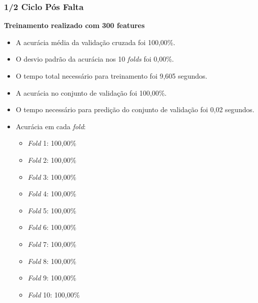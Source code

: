 \subsubsection{1/2 Ciclo Pós Falta}
\textbf{Treinamento realizado com 300 features}
\begin{itemize}
    \item A acurácia média da validação cruzada foi 100,00\%.
    \item O desvio padrão da acurácia nos 10 \textit{folds} foi 0,00\%.
    \item O tempo total necessário para treinamento foi 9,605 segundos.
    \item A acurácia no conjunto de validação foi 100,00\%.
    \item O tempo necessário para predição do conjunto de validação foi 0,02 segundos.
    \item Acurácia em cada \textit{fold}:
    \begin{itemize}
        \item \textit{Fold} 1: 100,00\%
        \item \textit{Fold} 2: 100,00\%
        \item \textit{Fold} 3: 100,00\%
        \item \textit{Fold} 4: 100,00\%
        \item \textit{Fold} 5: 100,00\%
        \item \textit{Fold} 6: 100,00\%
        \item \textit{Fold} 7: 100,00\%
        \item \textit{Fold} 8: 100,00\%
        \item \textit{Fold} 9: 100,00\%
        \item \textit{Fold} 10: 100,00\%
    \end{itemize}
\end{itemize}

